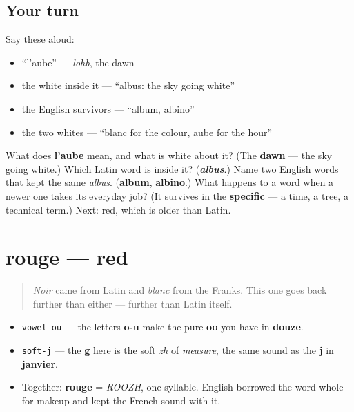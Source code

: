 \subsection*{Your turn}
Say these aloud:

\begin{itemize}
\raggedright
  \item \textquotedblleft{}l'aube\textquotedblright{} — \emph{lohb}, the dawn
  \item the white inside it — \textquotedblleft{}albus: the sky going white\textquotedblright{}
  \item the English survivors — \textquotedblleft{}album, albino\textquotedblright{}
  \item the two whites — \textquotedblleft{}blanc for the colour, aube for the hour\textquotedblright{}
\end{itemize}

\begin{tcolorbox}[breakable,colback=teal!4,colframe=teal!35!black,title={Before you move on}]
What does \textbf{l'aube} mean, and what is white about it? (The \textbf{dawn} — the sky going white.) Which Latin word is inside it? (\emph{\textbf{albus}}.) Name two English words that kept the same \emph{albus}. (\textbf{album}, \textbf{albino}.) What happens to a word when a newer one takes its everyday job? (It survives in the \textbf{specific} — a time, a tree, a technical term.) Next: red, which is older than Latin.
\end{tcolorbox}
\section[rouge]{rouge — red}

\label{lesson:FR-C13-rouge}



\begin{quote}
\emph{Noir} came from Latin and \emph{blanc} from the Franks. This one goes back further than either — further than Latin itself.
\end{quote}

\begin{sounds}
\begin{itemize}
\raggedright
  \item \texttt{vowel-ou} — the letters \textbf{o-u} make the pure \textbf{oo} you have in \textbf{douze}.
  \item \texttt{soft-j} — the \textbf{g} here is the soft \emph{zh} of \emph{measure}, the same sound as the \textbf{j} in \textbf{janvier}.
  \item Together: \textbf{rouge} = \emph{ROOZH}, one syllable. English borrowed the word whole for makeup and kept the French sound with it.
\end{itemize}
\end{sounds}

